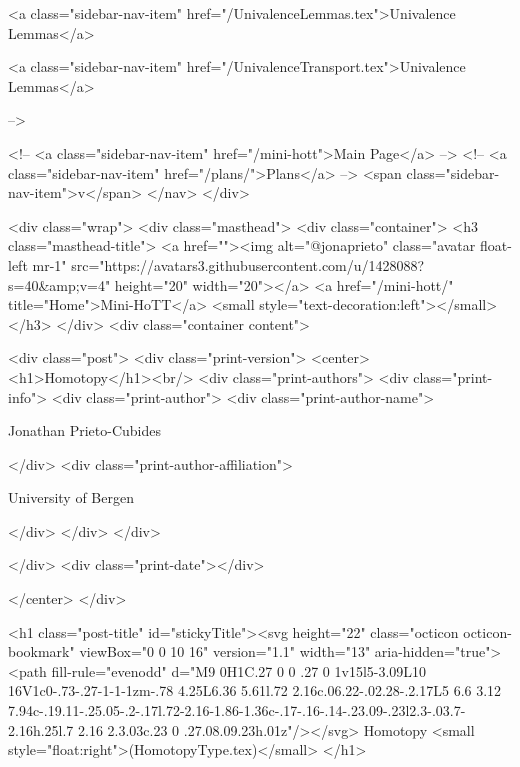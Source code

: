       
    
      
        
          <a class="sidebar-nav-item" href="/UnivalenceLemmas.tex">Univalence Lemmas</a>
        
      
    
      
        
          <a class="sidebar-nav-item" href="/UnivalenceTransport.tex">Univalence Lemmas</a>
        
      
     -->

    <!-- <a class="sidebar-nav-item" href="/mini-hott">Main Page</a> -->
    <!-- <a class="sidebar-nav-item" href="/plans/">Plans</a> -->
    <span class="sidebar-nav-item">v</span>
  </nav>
</div>

    <div class="wrap">
      <div class="masthead">
        <div class="container">
          <h3 class="masthead-title">
            <a href=""><img alt="@jonaprieto" class="avatar float-left mr-1" src="https://avatars3.githubusercontent.com/u/1428088?s=40&amp;v=4" height="20" width="20"></a>
            <a href="/mini-hott/" title="Home">Mini-HoTT</a>
            <small style="text-decoration:left"></small>
          </h3>
        </div>
      <div class="container content">
        







<div class="post">
  <div class="print-version">
    <center>
      <h1>Homotopy</h1><br/>
        <div class="print-authors">
          <div class="print-info">
            <div class="print-author">
              <div class="print-author-name">
                
                  Jonathan Prieto-Cubides
                
              </div>
              <div class="print-author-affiliation">
                
                  University of Bergen
                
                </div>
            </div>
          </div>
          
          
        </div>
        <div class="print-date"></div>
        
        
    </center>
  </div>

  

  <h1 class="post-title" id="stickyTitle"><svg height="22" class="octicon octicon-bookmark" viewBox="0 0 10 16" version="1.1" width="13" aria-hidden="true"><path fill-rule="evenodd" d="M9 0H1C.27 0 0 .27 0 1v15l5-3.09L10 16V1c0-.73-.27-1-1-1zm-.78 4.25L6.36 5.61l.72 2.16c.06.22-.02.28-.2.17L5 6.6 3.12 7.94c-.19.11-.25.05-.2-.17l.72-2.16-1.86-1.36c-.17-.16-.14-.23.09-.23l2.3-.03.7-2.16h.25l.7 2.16 2.3.03c.23 0 .27.08.09.23h.01z"/></svg> Homotopy <small style="float:right">(HomotopyType.tex)</small>
  </h1>

